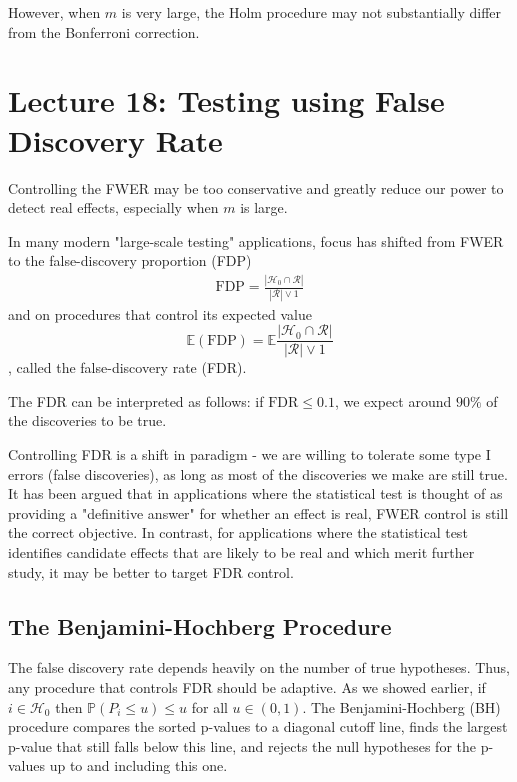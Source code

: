 \begin{remark}
    However, when $m$ is very large, the Holm procedure may not substantially differ from the Bonferroni correction.
\end{remark}
\section{Lecture 18: Testing using False Discovery Rate}

Controlling the FWER may be too conservative and greatly reduce our power to detect real effects, especially when $m$ is large. 
\begin{de}
    In many modern "large-scale testing" applications, focus has shifted from FWER to the false-discovery proportion (FDP)
\begin{align*}
\mathrm{FDP}=\frac{\left|\mathcal{H}_0 \cap \mathcal{R}\right|}{|\mathcal{R}| \vee 1}
\end{align*}
and on procedures that control its expected value $$\mathbb{E}(\mathrm{FDP})=\mathbb{E}\frac{\left|\mathcal{H}_0 \cap \mathcal{R}\right|}{|\mathcal{R}| \vee 1}$$, called the false-discovery rate (FDR).
\end{de}
\begin{remark}
    The FDR can be interpreted as follows: if $\mathrm{FDR} \leq 0.1$, we expect around $90 \%$ of the discoveries to be true.
\end{remark}


Controlling FDR is a shift in paradigm - we are willing to tolerate some type I errors (false discoveries), as long as most of the discoveries we make are still true. It has been argued that in applications where the statistical test is thought of as providing a "definitive answer" for whether an effect is real, FWER control is still the correct objective. In contrast, for applications where the statistical test identifies candidate effects that are likely to be real and which merit further study, it may be better to target FDR control.

\subsection{The Benjamini-Hochberg Procedure}
The false discovery rate depends heavily on the number of true hypotheses. Thus, any procedure that controls FDR should be adaptive. As we showed earlier, if $i \in \mathcal{H}_0$ then $\mathbb{P}\left(P_i \leq u\right) \leq u$ for all $u \in(0,1)$. The Benjamini-Hochberg (BH) procedure compares the sorted p-values to a diagonal cutoff line, finds the largest p-value that still falls below this line, and rejects the null hypotheses for the p-values up to and including this one. 


